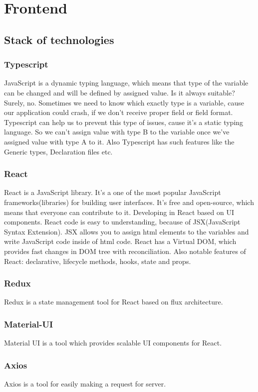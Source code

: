 \chapter{Frontend}\label{ch:B}

\section{Stack of technologies}
    \subsection{Typescript}
    JavaScript is a dynamic typing language, which means that type of the variable can be changed and will be defined by assigned value. Is it always suitable? Surely, no. Sometimes we need to know which exactly type is a variable, cause our application could crash, if we don't receive proper field or field format. Typescript can help us to prevent this type of issues, cause it's a static typing language. So we can't assign value with type B to the variable once we've assigned value with type A to it. Also Typescript has such features like the Generic types, Declaration files etc.
    \subsection{React}
    React is a JavaScript library. It's a one of the most popular JavaScript frameworks(libraries) for building user interfaces. It's free and open-source, which means that everyone can contribute to it. Developing in React based on UI components. React code is easy to understanding, because of JSX(JavaScript Syntax Extension). JSX allows you to assign html elements to the variables and write JavaScript code inside of html code. React has a Virtual DOM, which provides fast changes in DOM tree with reconciliation.
    Also notable features of React: declarative, lifecycle methods, hooks, state and props.
    
    \subsection{Redux}
    Redux is a state management tool for React based on flux architecture. 
    \subsection{Material-UI}
    Material UI is a tool which provides scalable UI components for React.
    \subsection{Axios}
    Axios is a tool for easily making a request for server.
